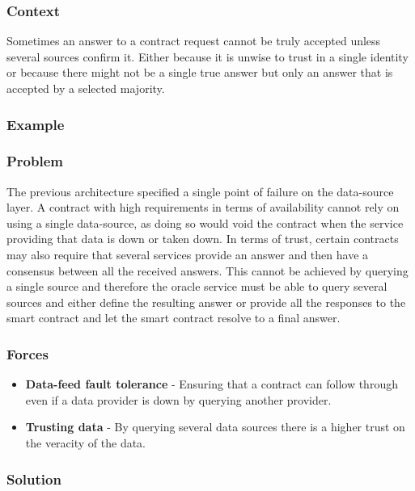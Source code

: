 \subsubsection{Context}
Sometimes an answer to a contract request cannot be truly accepted unless several sources confirm it. Either because it is unwise to trust in a single identity or because there might not be a single true answer but only an answer that is accepted by a selected majority.

\subsubsection{Example}

\subsubsection{Problem}
The previous architecture specified a single point of failure on the data-source layer. A contract with high requirements in terms of availability cannot rely on using a single data-source, as doing so would void the contract when the service providing that data is down or taken down. In terms of trust, certain contracts may also require that several services provide an answer and then have a consensus between all the received answers. This cannot be achieved by querying a single source and therefore the oracle service must be able to query several sources and either define the resulting answer or provide all the responses to the smart contract and let the smart contract resolve to a final answer.

\subsubsection{Forces}
\begin{itemize}
  \item \textbf{Data-feed fault tolerance} - Ensuring that a contract can follow through even if a data provider is down by querying another provider.
  \item \textbf{Trusting data} - By querying several data sources there is a higher trust on the veracity of the data.
\end{itemize}

\subsubsection{Solution}

